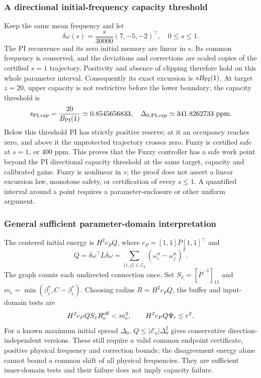 \subsubsection{A directional initial-frequency capacity threshold}
Keep the same mean frequency and let
\[
 \delta\omega(s)=\frac{s}{30000}(7,-5,-2)^\top,
 \quad 0\le s\le1.
\]
The PI recurrence and its zero initial memory are linear in $s$.
Its common frequency is conserved, and the deviations and corrections
are scaled copies of the certified $s=1$ trajectory. Positivity and
absence of clipping therefore hold on this whole parameter interval.
Consequently its exact excursion is $sB_{\rm PI}(1)$.
At target $z=20$, upper capacity is not restrictive before the
lower boundary; the capacity threshold is
\begin{equation}
 s_{\rm PI,cap}=\frac{20}{B_{\rm PI}(1)}
 \simeq0.8545656833,
 \quad\Delta_{0,\rm PI,cap}\simeq341.8262733\ \mathrm{ppm}.
 \label{detail:eq:btd_pi_directional_capacity}
\end{equation}
Below this threshold PI has strictly positive reserve; at it an
occupancy reaches zero, and above it the unprotected trajectory
crosses zero. Fuzzy is certified safe at $s=1$, or 400 ppm.
This proves that the Fuzzy controller has a safe work point beyond
the PI directional capacity threshold at the same target, capacity
and calibrated gains. Fuzzy is nonlinear in $s$; the proof does not
assert a linear excursion law, monotone safety, or certification of
every $s\le1$. A quantified interval around a point requires a
parameter-enclosure or other uniform argument.

\subsubsection{General sufficient parameter-domain interpretation}
The centered initial energy is
$H^2c_PQ$, where $c_P=[1,1]\bar P[1,1]^\top$ and
\[
 Q=\delta\omega^\top L\delta\omega
 =\sum_{\{i,j\}\in\mathcal E_u}(\omega_i^u-\omega_j^u)^2.
\]
The graph counts each undirected connection once. Set
$S_x=[\bar P^{-1}]_{11}$ and $m_e=\min(\beta_e^*,C-\beta_e^*)$.
Choosing radius $R=H^2c_PQ$, the buffer and input-domain tests are
\[
 H^2c_PQ S_xR_e^{\rm eff}<m_e^2,
 \qquad H^2c_PQ\Psi_i\le r^2.
\]
For a known maximum initial spread $\Delta_0$,
$Q\le|\mathcal E_u|\Delta_0^2$ gives conservative direction-independent
versions. These still require a valid common endpoint certificate,
positive physical frequency and correction bounds; the disagreement
energy alone cannot bound a common shift of all physical frequencies.
They are sufficient inner-domain tests and their failure does not
imply capacity failure.

